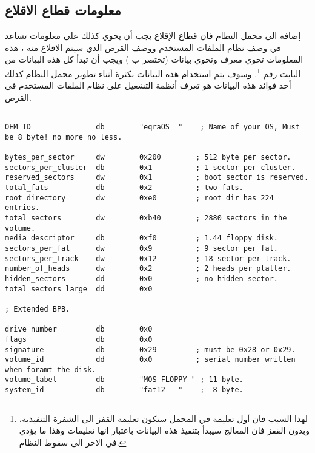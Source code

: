 \documentclass[document.tex]{subfiles}
\begin{document}
\subsection{معلومات قطاع الاقلاع}
إضافة الى محمل النظام فان قطاع الإقلاع  يجب أن يحوي كذلك على معلومات تساعد في وصف نظام الملفات المستخدم ووصف القرص الذي سيتم الاقلاع منه ، هذه المعلومات تحوي معرف  وتحوي بيانات  (تختصر ب ) ويجب أن تبدأ كل هذه البيانات من البايت رقم \footnote{لهذا السبب فان أول تعليمة في المحمل ستكون تعليمة القفز الى الشفرة التنفيذية، وبدون القفز فان المعالج سيبدأ بتنفيذ هذه البيانات باعتبار انها تعليمات وهذا ما يؤدي في الاخر الى سقوط النظام.}. وسوف يتم استخدام هذه البيانات بكثرة أثناء تطوير محمل النظام كذلك أحد فوائد هذه البيانات هو  تعرف أنظمة التشغيل على نظام الملفات المستخدم في القرص.


\begin{english}

\lstset{numberstyle=\tiny,numbers=left,stepnumber=1,numbersep=5pt,tabsize=2,extendedchars=true,breaklines=true,frame=b,showspaces=false, showtabs=false,xleftmargin=10pt,framexleftmargin=10pt,framexrightmargin=5pt,framexbottommargin=4pt,showstringspaces=false,language=[x86masm]Assembler}

\begin{lstlisting}[label=lst:bpb,caption=\en{Bios Parameter Block}]

OEM_ID               db        "eqraOS  "    ; Name of your OS, Must be 8 byte! no more no less.

bytes_per_sector     dw        0x200		; 512 byte per sector.
sectors_per_cluster  db        0x1          ; 1 sector per cluster.
reserved_sectors     dw        0x1          ; boot sector is reserved.
total_fats           db        0x2          ; two fats.
root_directory       dw        0xe0         ; root dir has 224 entries.
total_sectors        dw        0xb40        ; 2880 sectors in the volume.
media_descriptor     db        0xf0         ; 1.44 floppy disk.
sectors_per_fat      dw        0x9          ; 9 sector per fat.
sectors_per_track    dw        0x12         ; 18 sector per track.
number_of_heads      dw        0x2          ; 2 heads per platter.
hidden_sectors       dd        0x0          ; no hidden sector.
total_sectors_large  dd        0x0

; Extended BPB.

drive_number         db        0x0
flags                db        0x0
signature            db        0x29         ; must be 0x28 or 0x29.
volume_id            dd        0x0          ; serial number written when foramt the disk.
volume_label         db        "MOS FLOPPY " ; 11 byte.
system_id            db        "fat12   "    ;  8 byte.

\end{lstlisting}
\end{english}
\end{document}
